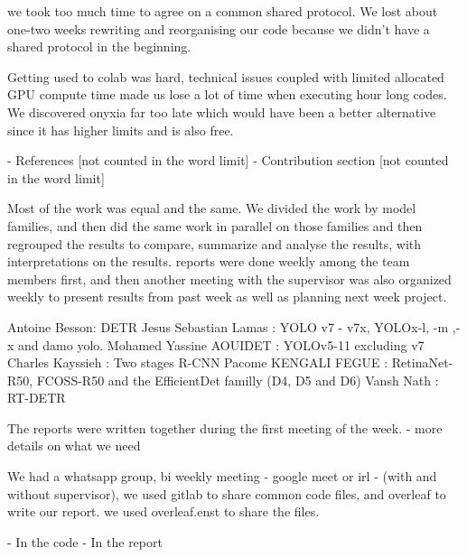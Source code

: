 \documentclass{article}
\begin{document}
we took too much time to agree on a common shared protocol. We lost about one-two weeks rewriting and reorganising our code because we didn't have a shared protocol in the beginning. 

Getting used to colab was hard, technical issues coupled with limited allocated GPU compute time made us lose a lot of time when executing hour long codes. We discovered onyxia far too late which would have been a better alternative since it has higher limits and is also free.


- References [not counted in the word limit]
- Contribution section [not counted in the word limit]


    Most of the work was equal and the same. We divided the work by model families, and then did the same work in parallel on those families and then regrouped the results to compare, summarize and analyse the results, with interpretations on the results. reports were done weekly among the team members first, and then another meeting with the supervisor was also organized weekly to present results from past week as well as planning next week project. 

    Antoine Besson: DETR
    Jesus Sebastian Lamas : YOLO v7 - v7x, YOLOx-l, -m ,-x and damo yolo. 
    Mohamed Yassine AOUIDET : YOLOv5-11 excluding v7 
    Charles Kayssieh : Two stages R-CNN 
    Pacome KENGALI FEGUE : RetinaNet-R50, FCOSS-R50 and the EfficientDet familly (D4, D5 and D6)
    Vansh Nath : RT-DETR 
    
    
    The reports were written together during the first meeting of the week. 
    -\> more details on what we need



    We had a whatsapp group, bi weekly meeting - google meet or irl - (with and without supervisor), we used gitlab to share common code files, and overleaf to write our report. we used overleaf.enst to share the files.  


    
  - In the code
  - In the report
\end{document}
